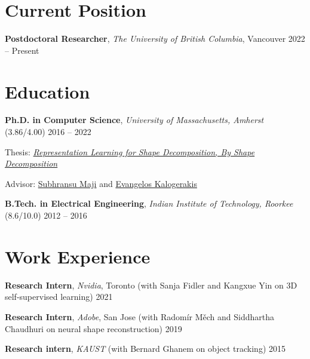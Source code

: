 \documentclass[11pt,letter,sans]{moderncv}
\begin{document}
\makecvtitle
\vspace{-1cm}

\rfoot{}

\section{Current Position}
\textbf{Postdoctoral Researcher}, \emph{The University of British Columbia}, Vancouver
    \hfill 2022 -- Present \par


\section{Education}
    \textbf{Ph.D. in Computer Science}, \emph{University of Massachusetts, Amherst}
        (3.86/4.00)
    \hfill 2016 -- 2022 \par
Thesis: \textit{\href{https://scholarworks.umass.edu/cgi/viewcontent.cgi?article=3707&context=dissertations_2}{Representation Learning for Shape Decomposition, By Shape Decomposition }} \par
Advisor: \href{https://people.cs.umass.edu/~smaji/}{Subhransu Maji} and \href{https://people.cs.umass.edu/~kalo/}{Evangelos Kalogerakis} \par
  \vspace{3mm}
    \textbf{B.Tech. in Electrical Engineering}, \emph{Indian Institute of Technology, Roorkee}
        (8.6/10.0)
    \hfill 2012 -- 2016 \par
  \vspace{3mm}
\vspace{-3mm}

\section{Work Experience}
\textbf{Research Intern}, \emph{Nvidia}, Toronto
    {\footnotesize \color{gray} (with Sanja Fidler and Kangxue Yin on 3D self-supervised learning)}
    \hfill 2021 \par
\textbf{Research Intern}, \emph{Adobe}, San Jose
    {\footnotesize \color{gray} (with Radomír Měch and Siddhartha Chaudhuri on neural shape reconstruction)}
    \hfill 2019 \par
\textbf{Research intern}, \emph{KAUST}    {\footnotesize \color{gray} (with Bernard Ghanem on object tracking)}
    \hfill 2015 \par
\end{document}
